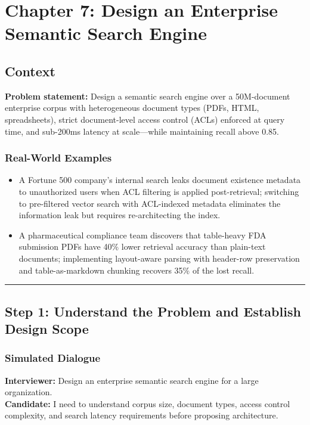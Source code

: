 \chapter{Chapter 7: Design an Enterprise Semantic Search Engine}

\section*{Context}

\textbf{Problem statement:} Design a semantic search engine over a 50M-document enterprise corpus with heterogeneous document types (PDFs, HTML, spreadsheets), strict document-level access control (ACLs) enforced at query time, and sub-200ms latency at scale---while maintaining recall above 0.85.

\subsection*{Real-World Examples}

\begin{itemize}
  \item A Fortune 500 company's internal search leaks document existence metadata to unauthorized users when ACL filtering is applied post-retrieval; switching to pre-filtered vector search with ACL-indexed metadata eliminates the information leak but requires re-architecting the index.
  \item A pharmaceutical compliance team discovers that table-heavy FDA submission PDFs have 40\% lower retrieval accuracy than plain-text documents; implementing layout-aware parsing with header-row preservation and table-as-markdown chunking recovers 35\% of the lost recall.
\end{itemize}

\bigskip\hrule\bigskip

\section*{Step 1: Understand the Problem and Establish Design Scope}

\subsection*{Simulated Dialogue}

\textbf{Interviewer:} Design an enterprise semantic search engine for a large organization.\\
\textbf{Candidate:} I need to understand corpus size, document types, access control complexity, and search latency requirements before proposing architecture.


